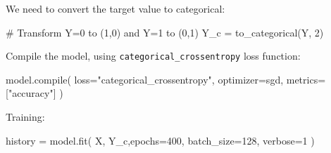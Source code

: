 \documentclass[a4paper,12pt]{article} %
\newcommand{\txtinline}[1]{\texttt{#1}}
\begin{document}
We need to convert the target value to categorical:
\begin{pythoncode}
# Transform Y=0 to (1,0) and Y=1 to (0,1)
Y_c = to_categorical(Y, 2)
\end{pythoncode}

Compile the model, using \txtinline{categorical_crossentropy} loss function:
\begin{pythoncode}
model.compile(
    loss="categorical_crossentropy",
    optimizer=sgd,
    metrics=["accuracy"]
)
\end{pythoncode}

Training:
\begin{pythoncode}
history = model.fit(
    X, Y_c,epochs=400,
    batch_size=128,
    verbose=1
)
\end{pythoncode}



\end{document}
